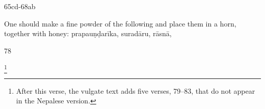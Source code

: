 \begin{translation}
\item [65cd-68ab]

One should make a fine powder of the following and place them in a horn, 
together with honey: %
\gls{prapauṇḍarīka},
\gls{suradāru},
\gls{rāsnā},





    
    \strut
    \bigskip
    
       
     \item[78] 
     
     \footnote{After this verse, the vulgate text adds five
        verses, 79--83, that do not appear in the Nepalese version.}
\end{translation}    
